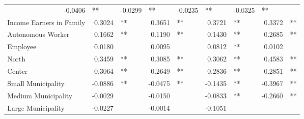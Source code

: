 \documentclass[12pt]{article}
\begin{document}
\begin{table}[!h]
\begin{tabular}{lllllllll}
  \multicolumn{1}{r}{-0.0406} &
  \multicolumn{1}{l}{**} &
  \multicolumn{1}{r}{-0.0299} &
  \multicolumn{1}{l}{**} &
  \multicolumn{1}{r}{-0.0235} &
  \multicolumn{1}{l}{**} &
  \multicolumn{1}{r}{-0.0325} &
  \multicolumn{1}{l}{**} \\
\multicolumn{1}{l}{Income Earners in Family} &
  \multicolumn{1}{r}{0.3024} &
  \multicolumn{1}{l}{**} &
  \multicolumn{1}{r}{0.3651} &
  \multicolumn{1}{l}{**} &
  \multicolumn{1}{r}{0.3721} &
  \multicolumn{1}{l}{**} &
  \multicolumn{1}{r}{0.3372} &
  \multicolumn{1}{l}{**} \\
\multicolumn{1}{l}{Autonomous Worker} &
  \multicolumn{1}{r}{0.1662} &
  \multicolumn{1}{l}{**} &
  \multicolumn{1}{r}{0.1190} &
  \multicolumn{1}{l}{**} &
  \multicolumn{1}{r}{0.1430} &
  \multicolumn{1}{l}{**} &
  \multicolumn{1}{r}{0.2685} &
  \multicolumn{1}{l}{**} \\
\multicolumn{1}{l}{Employee} &
  \multicolumn{1}{r}{0.0180} &
  \multicolumn{1}{l}{} &
  \multicolumn{1}{r}{0.0095} &
  \multicolumn{1}{l}{} &
  \multicolumn{1}{r}{0.0812} &
  \multicolumn{1}{l}{**} &
  \multicolumn{1}{r}{0.0102} &
  \multicolumn{1}{l}{} \\
\multicolumn{1}{l}{North} &
  \multicolumn{1}{r}{0.3459} &
  \multicolumn{1}{l}{**} &
  \multicolumn{1}{r}{0.3085} &
  \multicolumn{1}{l}{**} &
  \multicolumn{1}{r}{0.3062} &
  \multicolumn{1}{l}{**} &
  \multicolumn{1}{r}{0.4583} &
  \multicolumn{1}{l}{**} \\
\multicolumn{1}{l}{Center} &
  \multicolumn{1}{r}{0.3064} &
  \multicolumn{1}{l}{**} &
  \multicolumn{1}{r}{0.2649} &
  \multicolumn{1}{l}{**} &
  \multicolumn{1}{r}{0.2836} &
  \multicolumn{1}{l}{**} &
  \multicolumn{1}{r}{0.2851} &
  \multicolumn{1}{l}{**} \\
\multicolumn{1}{l}{Small Municipality} &
  \multicolumn{1}{r}{-0.0886} &
  \multicolumn{1}{l}{**} &
  \multicolumn{1}{r}{-0.0475} &
  \multicolumn{1}{l}{**} &
  \multicolumn{1}{r}{-0.1435} &
  \multicolumn{1}{l}{**} &
  \multicolumn{1}{r}{-0.3967} &
  \multicolumn{1}{l}{**} \\
\multicolumn{1}{l}{Medium Municipality} &
  \multicolumn{1}{r}{-0.0029} &
  \multicolumn{1}{l}{} &
  \multicolumn{1}{r}{-0.0150} &
  \multicolumn{1}{l}{} &
  \multicolumn{1}{r}{-0.0833} &
  \multicolumn{1}{l}{**} &
  \multicolumn{1}{r}{-0.2660} &
  \multicolumn{1}{l}{**} \\
\multicolumn{1}{l}{Large Municipality} &
  \multicolumn{1}{r}{-0.0227} &
  \multicolumn{1}{l}{} &
  \multicolumn{1}{r}{-0.0014} &
  \multicolumn{1}{l}{} &
  \multicolumn{1}{r}{-0.1051} &

\end{tabular}
\end{table}
\end{document}
